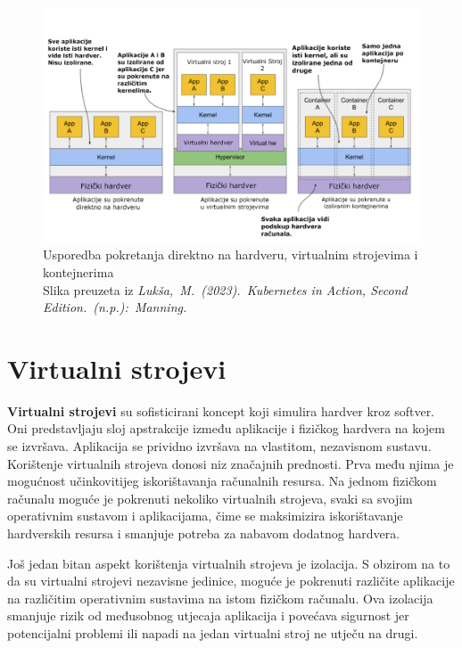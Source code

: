 \documentclass[times, utf8, diplomski]{fer}
\begin{document}
\begin{figure}[htb]
	\centering
	\includegraphics[width=15cm]{images/infra.png}
	\caption[Usporedba pokretanja direktno na hardveru, virtualnim strojevima i kontejnerima]{Usporedba pokretanja direktno na hardveru, virtualnim strojevima i kontejnerima\\Slika preuzeta iz \emph{Lukša, M. (2023). Kubernetes in Action, Second Edition. (n.p.): Manning.}}
	\label{fig:infra}
\end{figure}

\section{Virtualni strojevi}

\textbf{Virtualni strojevi}  su sofisticirani koncept koji simulira hardver kroz softver. Oni predstavljaju sloj apstrakcije između aplikacije i fizičkog hardvera na kojem se izvršava. Aplikacija se prividno izvršava na vlastitom, nezavisnom sustavu. \\

Korištenje virtualnih strojeva donosi niz značajnih prednosti. Prva među njima je mogućnost učinkovitijeg iskorištavanja računalnih resursa. Na jednom fizičkom računalu moguće je pokrenuti nekoliko virtualnih strojeva, svaki sa svojim operativnim sustavom i aplikacijama, čime se maksimizira iskorištavanje hardverskih resursa i smanjuje potreba za nabavom dodatnog hardvera.

Još jedan bitan aspekt korištenja virtualnih strojeva je izolacija. S obzirom na to da su virtualni strojevi nezavisne jedinice, moguće je pokrenuti različite aplikacije na različitim operativnim sustavima na istom fizičkom računalu. Ova izolacija smanjuje rizik od međusobnog utjecaja aplikacija i povećava sigurnost jer potencijalni problemi ili napadi na jedan virtualni stroj ne utječu na drugi.
\end{document}

